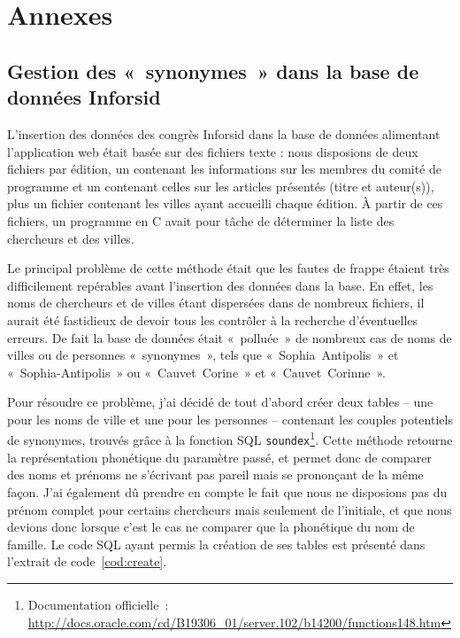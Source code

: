 
\chapter*{Annexes}

		\section*{Gestion des «~synonymes~» dans la base de données Inforsid}
			L'insertion des données des congrès Inforsid dans la base de données alimentant l'application web était basée sur des fichiers texte : nous disposions de deux fichiers par édition, un contenant les informations sur les membres du comité de programme et un contenant celles sur les articles présentés (titre et auteur(s)), plus un fichier contenant les villes ayant accueilli chaque édition. À partir de ces fichiers, un programme en C avait pour tâche de déterminer la liste des chercheurs et des villes.
			
			Le principal problème de cette méthode était que les fautes de frappe étaient très difficilement repérables avant l'insertion des données dans la base. En effet, les noms de chercheurs et de villes étant dispersées dans de nombreux fichiers, il aurait été fastidieux de devoir tous les contrôler à la recherche d'éventuelles erreurs. De fait la base de données était «~polluée~» de nombreux cas de noms de villes ou de personnes «~synonymes~», tels que «~Sophia~Antipolis~» et «~Sophia-Antipolis~» ou «~Cauvet~Corine~» et «~Cauvet~Corinne~».
			
			Pour résoudre ce problème, j'ai décidé de tout d'abord créer deux tables -- une pour les noms de ville et une pour les personnes -- contenant les couples potentiels de synonymes, trouvés grâce à la fonction SQL \texttt{soundex}\footnote{Documentation officielle~: \url{http://docs.oracle.com/cd/B19306_01/server.102/b14200/functions148.htm}}. Cette méthode retourne la représentation phonétique du paramètre passé, et permet donc de comparer des noms et prénoms ne s'écrivant pas pareil mais se prononçant de la même façon. J'ai également dû prendre en compte le fait que nous ne disposions pas du prénom complet pour certains chercheurs mais seulement de l'initiale, et que nous devions donc lorsque c'est le cas ne comparer que la phonétique du nom de famille. Le code SQL ayant permis la création de ses tables est présenté dans l'extrait de code~\ref{cod:create}.
			
			
			
